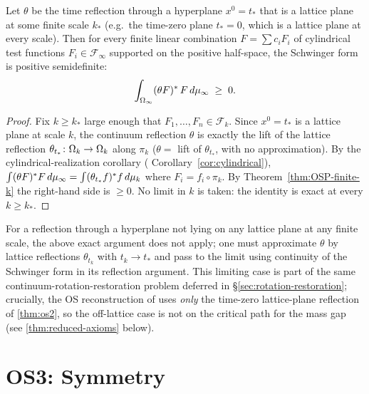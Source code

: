 \begin{theorem}
\label{thm:os2}
Let $\theta$ be the time reflection through a hyperplane
$x^0 = t_\ast$ that is a lattice plane at some finite scale $k_\ast$
(e.g.\ the time-zero plane $t_\ast = 0$, which is a lattice plane at
every scale).  Then for every finite linear combination
$F = \sum c_i F_i$ of cylindrical test functions
$F_i \in \mathcal{F}_\infty$ supported on the positive half-space, the
Schwinger form is positive semidefinite:
\begin{equation*}
  \int_{\Omega_\infty} (\theta F)^* \, F \, d\mu_\infty \;\ge\; 0.
\end{equation*}
\end{theorem}

\begin{proof}
Fix $k \ge k_\ast$ large enough that $F_1, \ldots, F_n \in
\mathcal{F}_k$.  Since $x^0 = t_\ast$ is a lattice plane at scale $k$,
the continuum reflection $\theta$ is exactly the lift of the lattice
reflection $\theta_{t_\ast} \colon \Omega_k \to \Omega_k$ along $\pi_k$
($\theta = $ lift of $\theta_{t_\ast}$, with no approximation).  By
the cylindrical-realization corollary
( Corollary~\ref{cor:cylindrical}),
$\int (\theta F)^* F \, d\mu_\infty = \int (\theta_{t_\ast} f)^* f \,
d\mu_k$ where $F_i = f_i \circ \pi_k$.  By
Theorem~\ref{thm:OSP-finite-k} the right-hand side is $\ge 0$.  No
limit in $k$ is taken: the identity is exact at every $k \ge k_\ast$.
\end{proof}

\begin{remark}
\label{rem:os2-offlattice}
For a reflection through a hyperplane not lying on any lattice plane
at any finite scale, the above exact argument does not apply; one must
approximate $\theta$ by lattice reflections $\theta_{t_k}$ with
$t_k \to t_\ast$ and pass to the limit using continuity of the
Schwinger form in its reflection argument.  This limiting case is part
of the same continuum-rotation-restoration problem deferred in
\S\ref{sec:rotation-restoration}; crucially, the OS reconstruction
of  uses \emph{only} the time-zero
lattice-plane reflection of \cref{thm:os2}, so the off-lattice case is
not on the critical path for the mass gap (see
\cref{thm:reduced-axioms} below).
\end{remark}

\section{OS3: Symmetry}
\label{sec:os3}

